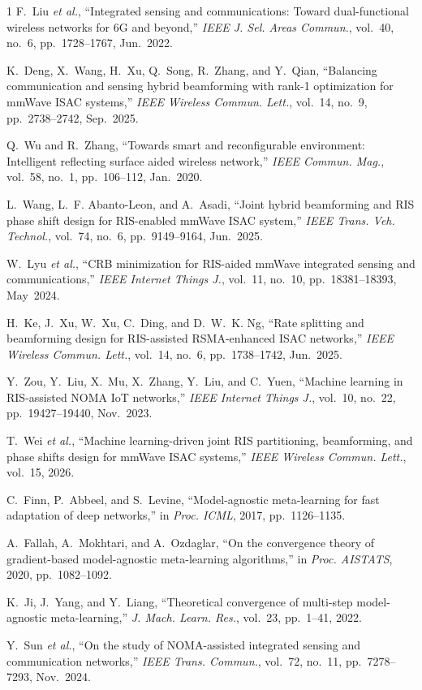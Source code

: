 \begin{thebibliography}{1}
F.~Liu \emph{et al.}, ``Integrated sensing and communications: Toward
dual-functional wireless networks for 6G and beyond,''
\emph{IEEE J. Sel. Areas Commun.}, vol.~40, no.~6, pp.~1728--1767, Jun.~2022.

K.~Deng, X.~Wang, H.~Xu, Q.~Song, R.~Zhang, and Y.~Qian, ``Balancing
communication and sensing hybrid beamforming with rank-1 optimization for
mmWave ISAC systems,'' \emph{IEEE Wireless Commun. Lett.}, vol.~14, no.~9,
pp.~2738--2742, Sep.~2025.

Q.~Wu and R.~Zhang, ``Towards smart and reconfigurable environment: Intelligent
reflecting surface aided wireless network,'' \emph{IEEE Commun. Mag.}, vol.~58,
no.~1, pp.~106--112, Jan.~2020.

L.~Wang, L.~F. Abanto-Leon, and A.~Asadi, ``Joint hybrid beamforming and RIS
phase shift design for RIS-enabled mmWave ISAC system,'' \emph{IEEE Trans. Veh.
Technol.}, vol.~74, no.~6, pp.~9149--9164, Jun.~2025.

W.~Lyu \emph{et al.}, ``CRB minimization for RIS-aided mmWave integrated sensing
and communications,'' \emph{IEEE Internet Things J.}, vol.~11, no.~10,
pp.~18381--18393, May~2024.

H.~Ke, J.~Xu, W.~Xu, C.~Ding, and D.~W.~K. Ng, ``Rate splitting and beamforming
design for RIS-assisted RSMA-enhanced ISAC networks,'' \emph{IEEE Wireless
Commun. Lett.}, vol.~14, no.~6, pp.~1738--1742, Jun.~2025.

Y.~Zou, Y.~Liu, X.~Mu, X.~Zhang, Y.~Liu, and C.~Yuen, ``Machine learning in
RIS-assisted NOMA IoT networks,'' \emph{IEEE Internet Things J.}, vol.~10,
no.~22, pp.~19427--19440, Nov.~2023.

T.~Wei \emph{et al.}, ``Machine learning-driven joint RIS partitioning,
beamforming, and phase shifts design for mmWave ISAC systems,'' \emph{IEEE
Wireless Commun. Lett.}, vol.~15, 2026.

C.~Finn, P.~Abbeel, and S.~Levine, ``Model-agnostic meta-learning for fast
adaptation of deep networks,'' in \emph{Proc. ICML}, 2017, pp.~1126--1135.

A.~Fallah, A.~Mokhtari, and A.~Ozdaglar, ``On the convergence theory of
gradient-based model-agnostic meta-learning algorithms,'' in \emph{Proc.
AISTATS}, 2020, pp.~1082--1092.

K.~Ji, J.~Yang, and Y.~Liang, ``Theoretical convergence of multi-step
model-agnostic meta-learning,'' \emph{J. Mach. Learn. Res.}, vol.~23, pp.~1--41,
2022.

Y.~Sun \emph{et al.}, ``On the study of NOMA-assisted integrated sensing and
communication networks,'' \emph{IEEE Trans. Commun.}, vol.~72, no.~11,
pp.~7278--7293, Nov.~2024.
\end{thebibliography}


